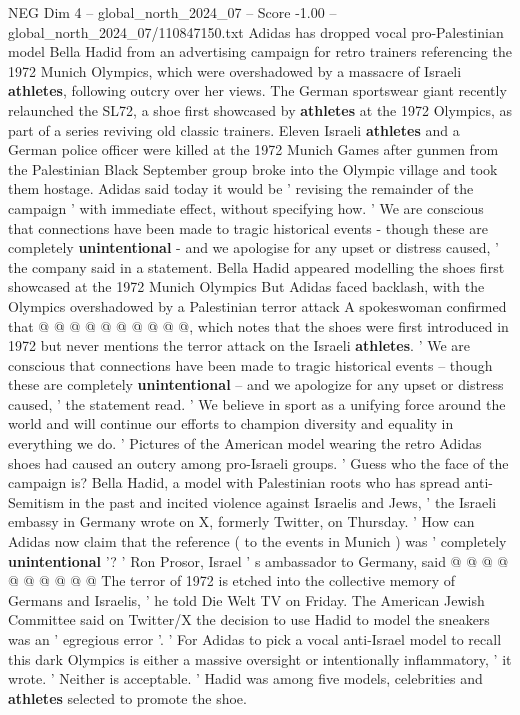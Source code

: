 \begin{textsample}{NEG Dim 4 – global\_north\_2024\_07 – Score -1.00 – global\_north\_2024\_07/110847150.txt}  \label{ex:f4_neg_261}
Adidas has dropped vocal pro-Palestinian model Bella Hadid from an advertising campaign for retro trainers referencing the 1972 Munich Olympics, which were overshadowed by a massacre of Israeli \textbf{athletes}, following outcry over her views.
The German sportswear giant recently relaunched the SL72, a shoe first showcased by \textbf{athletes} at the 1972 Olympics, as part of a series reviving old classic trainers.
Eleven Israeli \textbf{athletes} and a German police officer were killed at the 1972 Munich Games after gunmen from the Palestinian Black September group broke into the Olympic village and took them hostage.
Adidas said today it would be ' revising the remainder of the campaign ' with immediate effect, without specifying how. ' We are conscious that connections have been made to tragic historical events - though these are completely \textbf{unintentional} - and we apologise for any upset or distress caused, ' the company said in a statement.
Bella Hadid appeared modelling the shoes first showcased at the 1972 Munich Olympics But Adidas faced backlash, with the Olympics overshadowed by a Palestinian terror attack A spokeswoman confirmed that @ @ @ @ @ @ @ @ @ @, which notes that the shoes were first introduced in 1972 but never mentions the terror attack on the Israeli \textbf{athletes}. ' We are conscious that connections have been made to tragic historical events -- though these are completely \textbf{unintentional} -- and we apologize for any upset or distress caused, ' the statement read. ' We believe in sport as a unifying force around the world and will continue our efforts to champion diversity and equality in everything we do. ' Pictures of the American model wearing the retro Adidas shoes had caused an outcry among pro-Israeli groups. ' Guess who the face of the campaign is?
Bella Hadid, a model with Palestinian roots who has spread anti-Semitism in the past and incited violence against Israelis and Jews, ' the Israeli embassy in Germany wrote on X, formerly Twitter, on Thursday. ' How can Adidas now claim that the reference ( to the events in Munich ) was ' completely \textbf{unintentional} '? ' Ron Prosor, Israel ' s ambassador to Germany, said @ @ @ @ @ @ @ @ @ @ The terror of 1972 is etched into the collective memory of Germans and Israelis, ' he told Die Welt TV on Friday.
The American Jewish Committee said on Twitter/X the decision to use Hadid to model the sneakers was an ' egregious error '. ' For Adidas to pick a vocal anti-Israel model to recall this dark Olympics is either a massive oversight or intentionally inflammatory, ' it wrote. ' Neither is acceptable. ' Hadid was among five models, celebrities and \textbf{athletes} selected to promote the shoe.

\end{textsample}
